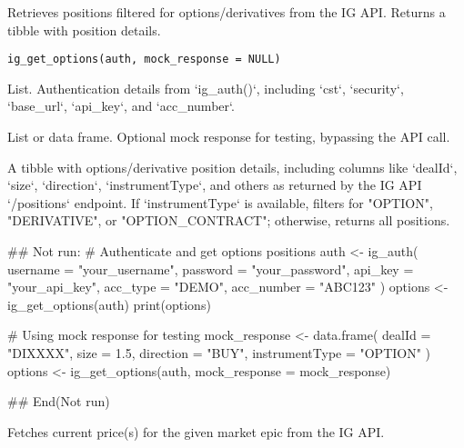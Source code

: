\documentclass[a4paper]{book}
\begin{document}
%
\begin{Description}
Retrieves positions filtered for options/derivatives from the IG API. Returns a tibble with position details.
\end{Description}
%
\begin{Usage}
\begin{verbatim}
ig_get_options(auth, mock_response = NULL)
\end{verbatim}
\end{Usage}
%
\begin{Arguments}
\begin{ldescription}
\item[\code{auth}] List. Authentication details from `ig\_auth()`, including `cst`, `security`, `base\_url`, `api\_key`, and `acc\_number`.

\item[\code{mock\_response}] List or data frame. Optional mock response for testing, bypassing the API call.
\end{ldescription}
\end{Arguments}
%
\begin{Value}
A tibble with options/derivative position details, including columns like `dealId`, `size`, `direction`, `instrumentType`, and others as returned by the IG API `/positions` endpoint. If `instrumentType` is available, filters for "OPTION", "DERIVATIVE", or "OPTION\_CONTRACT"; otherwise, returns all positions.
\end{Value}
%
\begin{Examples}
\begin{ExampleCode}
## Not run: 
# Authenticate and get options positions
auth <- ig_auth(
  username = "your_username",
  password = "your_password",
  api_key = "your_api_key",
  acc_type = "DEMO",
  acc_number = "ABC123"
)
options <- ig_get_options(auth)
print(options)

# Using mock response for testing
mock_response <- data.frame(
  dealId = "DIXXXX",
  size = 1.5,
  direction = "BUY",
  instrumentType = "OPTION"
)
options <- ig_get_options(auth, mock_response = mock_response)

## End(Not run)

\end{ExampleCode}
\end{Examples}
%
\begin{Description}
Fetches current price(s) for the given market epic from the IG API.
\end{Description}
\end{document}
